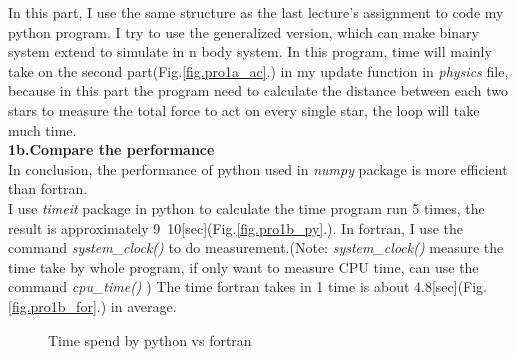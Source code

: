 \documentclass{article}
\begin{document}
In this part, I use the same structure as the last lecture's assignment to code my python program. I try to use the generalized version, which can make binary system extend to simulate in n body system. In this program, time will mainly take on the second part(Fig.\ref{fig.pro1a_ac}.) in my update function in \emph{physics} file, because in this part the program need to calculate the distance between each two stars to measure the total force to act on every single star, the loop will take much time.\\

\textbf{1b.Compare the performance}\\

In conclusion, the performance of python used in \emph{numpy} package is more efficient than fortran.\\
I use \emph{timeit} package in python to calculate the time program run 5 times, the result is approximately 9~10[sec](Fig.\ref{fig.pro1b_py}.). In fortran, I use the command \emph{system\_clock()} to do measurement.(Note: \emph{system\_clock()} measure the time take by whole program, if only want to measure CPU time, can use the command \emph{cpu\_time()} ) The time fortran takes in 1 time is about 4.8[sec](Fig.\ref{fig.pro1b_for}.) in average.
\begin{figure}[h]
    \centering
    \caption{Time spend by python vs fortran}
    \label{fig.pro1b}
\end{figure}
\end{document}
